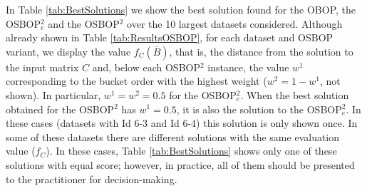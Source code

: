\documentclass[preprint,12pt]{article}
\theoremstyle{definition}
\theoremstyle{remark}
\theoremstyle{example} %
\begin{document}
In Table \ref{tab:BestSolutions} we show the best solution found for the OBOP, the OSBOP$^2_e$ and the OSBOP$^2$ over the 10 largest datasets considered. Although already shown in Table \ref{tab:ResultsOSBOP}, for each dataset and OSBOP variant, we display the value $f_C(\overline{B})$, that is, the distance from the solution to the input matrix $C$ and, below each OSBOP$^2$ instance, the value $w^1$ corresponding to the bucket order with the highest weight ($w^2=1-w^1$, not shown). In particular, $w^1=w^2=0.5$ for the OSBOP$^2_e$.   
When the best solution obtained for the OSBOP$^2$ has $w^1=0.5$, it is also the solution to the OSBOP$^2_e$. In these cases (datasets with Id 6-3 and Id 6-4) this solution is only shown once. 
In some of these datasets there are different solutions with the same evaluation value ($f_C$). In these cases, Table \ref{tab:BestSolutions} shows only one of these solutions with equal score;
however, in practice, all of them should be presented to the practitioner for decision-making.
\end{document}
